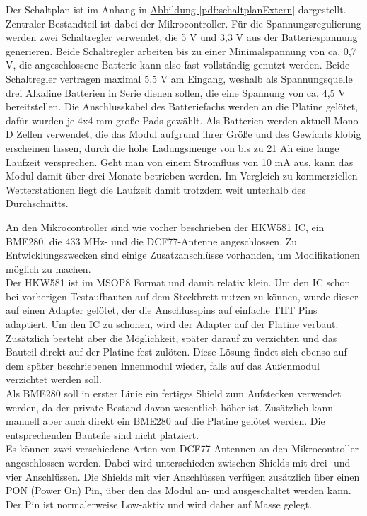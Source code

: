 \documentclass[a4paper,11pt]{article}
\begin{document}
Der Schaltplan ist im Anhang in \hyperref[pdf:schaltplanExtern]{Abbildung \ref{pdf:schaltplanExtern}} dargestellt. Zentraler Bestandteil ist dabei der Mikrocontroller. 
Für die Spannungsregulierung werden zwei Schaltregler verwendet, die 5 V und 3,3 V aus der Batteriespannung generieren. Beide Schaltregler arbeiten bis zu einer Minimalspannung
von ca. 0,7 V, die angeschlossene Batterie kann also fast vollständig genutzt werden. Beide Schaltregler vertragen maximal 5,5 V am Eingang, weshalb als Spannungsquelle
drei Alkaline Batterien in Serie dienen sollen, die eine Spannung von ca. 4,5 V bereitstellen. 
Die Anschlusskabel des Batteriefachs werden an die Platine gelötet, dafür wurden je 4x4 mm große Pads gewählt. 
Als Batterien werden aktuell Mono D Zellen verwendet, die das Modul aufgrund ihrer Größe und des Gewichts klobig erscheinen lassen, durch die hohe Ladungsmenge von bis zu
21 Ah eine lange Laufzeit versprechen. Geht man von einem Stromfluss von 10 mA aus, kann das Modul damit über drei Monate betrieben werden. Im Vergleich zu kommerziellen
Wetterstationen liegt die Laufzeit damit trotzdem weit unterhalb des Durchschnitts.  

\vspace{0.2cm}
\noindent
An den Mikrocontroller sind wie vorher beschrieben der HKW581 IC, ein BME280, die 433 MHz- und die DCF77-Antenne angeschlossen. Zu Entwicklungszwecken sind einige 
Zusatzanschlüsse vorhanden, um Modifikationen möglich zu machen. \\
Der HKW581 ist im MSOP8 Format und damit relativ klein. Um den IC schon bei vorherigen Testaufbauten auf dem Steckbrett nutzen zu können, wurde dieser auf einen Adapter
gelötet, der die Anschlusspins auf einfache THT Pins adaptiert. Um den IC zu schonen, wird der Adapter auf der Platine verbaut. Zusätzlich besteht aber die Möglichkeit, 
später darauf zu verzichten und das Bauteil direkt auf der Platine fest zulöten. Diese Lösung findet sich ebenso auf dem später beschriebenen Innenmodul wieder, falls
auf das Außenmodul verzichtet werden soll. \\
Als BME280 soll in erster Linie ein fertiges Shield zum Aufstecken verwendet werden, da der private Bestand davon wesentlich höher ist. Zusätzlich kann manuell aber auch
direkt ein BME280 auf die Platine gelötet werden. Die entsprechenden Bauteile sind nicht platziert. \\
Es können zwei verschiedene Arten von DCF77 Antennen an den Mikrocontroller angeschlossen werden. Dabei wird unterschieden zwischen Shields mit drei- und vier Anschlüssen. 
Die Shields mit vier Anschlüssen verfügen zusätzlich über einen PON (Power On) Pin, über den das Modul an- und ausgeschaltet werden kann. Der Pin ist normalerweise Low-aktiv und wird daher auf Masse gelegt. 
\end{document}

